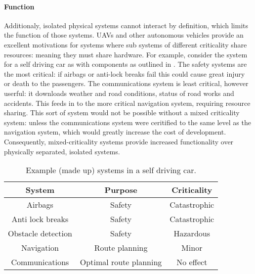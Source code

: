 \paragraph{Function}

Additionaly, isolated physical systems cannot interact by definition, which limits the function of those systems. 
\glspl{UAV} and other autonomous vehicles provide an excellent motivations for systems where sub systems of different criticality share resources: meaning they must share hardware.
For example, consider the system for a self driving car as with components as outlined in .
The safety systems are the most critical: if airbags or anti-lock breaks fail this could cause great injury or death to the passengers.
The communications system is least critical, however userful: it downloads weather and road conditions, status of road works and accidents. 
This feeds in to the more critical navigation system, requiring resource sharing.
This sort of system would not be possible without a mixed criticality system: unless the communications system were ceritified to the same level as the navigation system, which would greatly increase the cost of development. 
Consequently, mixed-criticality systems provide increased functionality over physically separated, isolated systems.

\begin{table} 
\begin{center}
\begin{tabular}{|c|c|c|}\hline
    \textbf{System}     & \textbf{Purpose} & \textbf{Criticality} \\\hline
     Airbags            & Safety &  Catastrophic \\\hline
     Anti lock breaks   & Safety &  Catastrophic \\\hline
     Obstacle detection & Safety &  Hazardous \\\hline
     Navigation         & Route planning & Minor \\\hline  
     Communications     & Optimal route planning & No effect \\\hline
\end{tabular}
\caption{Example (made up) systems in a self driving car.}
\label{tab:self-driving-car}
\end{center}
\end{table}


